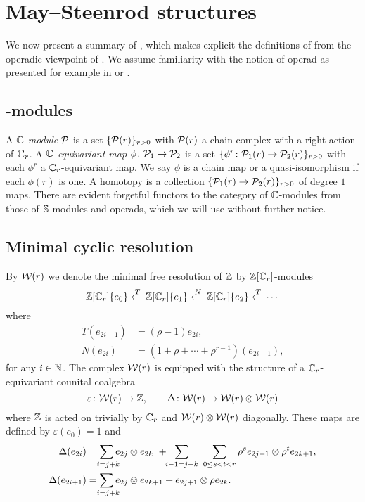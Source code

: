 
\section{May--Steenrod structures}\label{s:may_st}

\noindent We now present a summary of \cite{medina2021may_st}, which makes explicit the definitions of \cite{steenrod1953cyclic} from the operadic viewpoint of \cite{may1970general}.
We assume familiarity with the notion of operad as presented for example in \cite{may1997operads} or \cite{loday2012operads}.

\subsection{\pdfC-modules}

A \textit{$\mathbb{C}$-module} $\mathcal{P}$ is a set $\{\mathcal{P}(r)\}_{r>0}$ with $\mathcal{P}(r)$ a chain complex with a right action of $\mathbb{C}_r$.
A \textit{$\mathbb{C}$-equivariant map} $\phi \colon \mathcal{P}_1 \to \mathcal{P}_2$ is a set $\{\phi^r \colon \mathcal{P}_1(r) \to \mathcal{P}_2(r)\}_{r>0}$ with each $\phi^r$ a $\mathbb{C}_r$-equivariant map.
We say $\phi$ is a chain map or a quasi-isomorphism if each $\phi(r)$ is one.
A homotopy is a collection $\{\mathcal{P}_1(r) \to \mathcal{P}_2(r)\}_{r>0}$ of degree $1$ maps.
There are evident forgetful functors to the category of $\mathbb{C}$-modules from those of $\mathbb{S}$-modules and operads, which we will use without further notice.

\subsection{Minimal cyclic resolution}

By $\mathcal{W}(r)$ we denote the minimal free resolution of $\mathbb{Z}$ by $\mathbb{Z}[\mathbb{C}_r]$-modules
\[
\mathbb{Z}[\mathbb{C}_r]\{e_0\} \xleftarrow{T} \mathbb{Z}[\mathbb{C}_r]\{e_1\} \xleftarrow{N} \mathbb{Z}[\mathbb{C}_r]\{e_2\} \xleftarrow{T} \cdots
\]
where
\[
\begin{split}
	T(e_{2i+1}) &= (\rho-1)e_{2i}, \\
	N(e_{2i}) &= (1 + \rho + \cdots + \rho^{r-1})(e_{2i-1}),
\end{split}
\]
for any $i \in \mathbb{N}$.
The complex $\mathcal{W}(r)$ is equipped with the structure of a $\mathbb{C}_r$-equivariant counital coalgebra
\[
\varepsilon \colon \mathcal{W}(r) \to \mathbb{Z}, \qquad
\Delta \colon \mathcal{W}(r) \to \mathcal{W}(r) \otimes \mathcal{W}(r)
\]
where $\mathbb{Z}$ is acted on trivially by $\mathbb{C}_r$ and $\mathcal{W}(r) \otimes \mathcal{W}(r)$ diagonally.
These maps are defined by $\varepsilon(e_0) = 1$ and
\begin{align*}
	\Delta(e_{2i}) &=
	\sum_{\ \mathclap{i=j+k}} e_{2j} \ot e_{2k} \ + \!\! \sum_{i-1=j+k} \ \sum_{0 \leq s < t < r} \rho^s e_{2j+1} \ot \rho^t e_{2k+1}, \\
	\Delta(e_{2i+1}) &=
	\sum_{\ \mathclap{i=j+k}} e_{2j} \ot e_{2k+1} + e_{2j+1} \ot \rho e_{2k}.
\end{align*}

